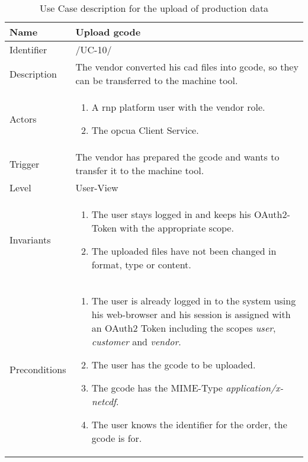\documentclass[
a4paper,
twoside,
headsepline,
cleardoublepage=empty,
parskip=half,
draft=false
]{scrbook}
\begin{document}
				\begin{table}[htbp]
					\centering
					\caption{Use Case description for the upload of production data}
					\label{tab:use_case_upload}
					\begin{tabular}{L R}%
						\toprule
						Name & Upload \gls{gcode}
						\\ \midrule
						Identifier & /UC-10/
						\\ \midrule
						Description & The vendor converted his \gls{cad} files into \gls{gcode}, so they can be transferred to the machine tool.
						\\ \midrule
						Actors & \begin{enumerate}\item A \gls{rnp} platform user with the vendor role. \item The \gls{opcua} Client Service.\end{enumerate}
						\\ \midrule
						Trigger & The vendor has prepared the \gls{gcode} and wants to transfer it to the machine tool.
						\\ \midrule
						Level & User-View
						\\ \midrule
						Invariants & \begin{enumerate}\item The user stays logged in and keeps his OAuth2-Token with the appropriate scope. \item The uploaded files have not been changed in format, type or content.\end{enumerate}
						\\ \midrule
						Preconditions &
						\begin{enumerate}
							\item The user is already logged in to the system using his web-browser and his session is assigned with an OAuth2 Token including the scopes \textit{user}, \textit{customer} and \textit{vendor}.
							\item The user has the \gls{gcode} to be uploaded.
							\item The \gls{gcode} has the MIME-Type \textit{application/x-netcdf}.
							\item The user knows the identifier for the order, the \gls{gcode} is for.
						\end{enumerate}
						\\ \midrule

\end{tabular}
\end{table}
\end{document}
